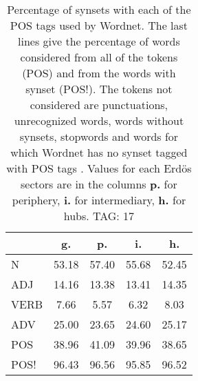 \begin{table}[h!]
\begin{center}
\begin{tabular}{| l || c | c | c | c |}\hline
 & {\bf g.} & {\bf p.} & {\bf i.} & {\bf h.} \\\hline\hline
N & 53.18  & 57.40  & 55.68  & 52.45 \\\hline
ADJ & 14.16  & 13.38  & 13.41  & 14.35 \\\hline
VERB & 7.66  & 5.57  & 6.32  & 8.03 \\\hline
ADV & 25.00  & 23.65  & 24.60  & 25.17 \\\hline\hline
POS & 38.96  & 41.09  & 39.96  & 38.65 \\\hline
POS! & 96.43  & 96.56  & 95.85  & 96.52 \\\hline
\end{tabular}
\caption{Percentage of synsets with each of the POS tags used by Wordnet. The last lines give the percentage of words considered from all of the tokens (POS) and from the words with synset (POS!). The tokens not considered are punctuations, unrecognized words, words without synsets, stopwords and words for which Wordnet has no synset  tagged with POS tags . Values for each Erd\"os sectors are in the columns {{\bf p.}} for periphery, {{\bf i.}} for intermediary, {{\bf h.}} for hubs. TAG: 17}
\end{center}
\end{table}